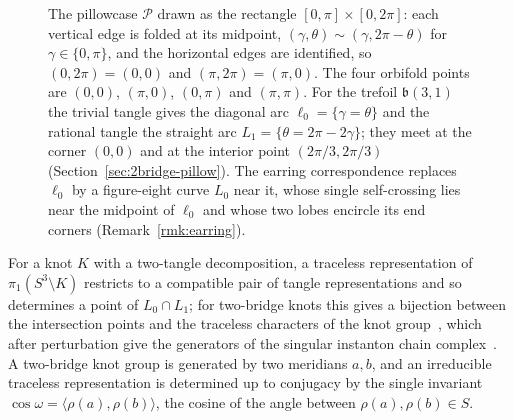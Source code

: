 \documentclass[11pt,reqno]{amsart}
\theoremstyle{plain}
\theoremstyle{definition}
\newcommand{\pill}{\mathcal{P}}
\newcommand{\bp}{\mathfrak{b}}
\begin{document}
\begin{figure}[ht]
\centering
{}
\caption{The pillowcase $\pill$ drawn as the rectangle $[0,\pi]\times[0,2\pi]$: each vertical edge is
folded at its midpoint, $(\gamma,\theta)\sim(\gamma,2\pi-\theta)$ for $\gamma\in\{0,\pi\}$, and the
horizontal edges are identified, so $(0,2\pi)=(0,0)$ and $(\pi,2\pi)=(\pi,0)$. The four orbifold points
are $(0,0)$, $(\pi,0)$, $(0,\pi)$ and $(\pi,\pi)$. For the trefoil $\bp(3,1)$ the trivial tangle gives the
diagonal arc $\ell_0=\{\gamma=\theta\}$ and the rational tangle the straight arc $L_1=\{\theta=2\pi-2\gamma\}$;
they meet at the corner $(0,0)$ and at the interior point $(2\pi/3,2\pi/3)$
(Section~\ref{sec:2bridge-pillow}). The earring correspondence replaces $\ell_0$ by a figure-eight curve
$L_0$ near it, whose single self-crossing lies near the midpoint of $\ell_0$ and whose two lobes encircle
its end corners (Remark~\ref{rmk:earring}).}
\label{fig:pillow}
\end{figure}

For a knot $K$ with a two-tangle decomposition, a traceless representation of $\pi_1(S^3\setminus K)$
restricts to a compatible pair of tangle representations and so determines a point of $L_0\cap L_1$; for
two-bridge knots this gives a bijection between the intersection points and the traceless characters of
the knot group~\cite[\S10]{HHK1}, which after perturbation give the generators of the singular instanton
chain complex~\cite{KM1,KM2}. A two-bridge knot group is generated by two meridians $a,b$, and an
irreducible traceless representation is determined up to conjugacy by the single invariant
$\cos\omega=\langle\rho(a),\rho(b)\rangle$, the cosine of the angle between $\rho(a),\rho(b)\in S$.
\end{document}
